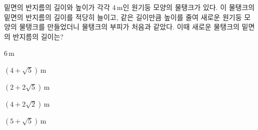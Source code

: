 밑면의 반지름의 길이와 높이가 각각 $4\,\mathrm{m}$인 원기둥 모양의 물탱크가 있다. 이 물탱크의 밑면의 반지름의 길이를 적당히 늘이고, 같은 길이만큼 높이를 줄여 새로운 원기둥 모양의 물탱크를 만들었더니 물탱크의 부피가 처음과 같았다. 이때 새로운 물탱크의 밑면의 반지름의 길이는?
\begin{choices32}{\rule[-3ex]{0pt}{8ex}$6\,\mathrm{m}$}{\rule[-3ex]{0pt}{8ex}$(4+\sqrt{5})\,\mathrm{m}$}{\rule[-3ex]{0pt}{8ex}$(2+2\sqrt{5})\,\mathrm{m}$}{\rule[-3ex]{0pt}{8ex}$(4+2\sqrt{2})\,\mathrm{m}$}{\rule[-3ex]{0pt}{8ex}$(5+\sqrt{5})\,\mathrm{m}$}\end{choices32}
